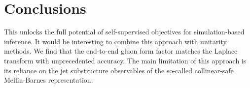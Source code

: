 \section{Conclusions}\label{sec:conclusions}

This unlocks the full potential of self-supervised objectives for
simulation-based inference. It would be interesting to combine this
approach with unitarity methods. We find that the end-to-end gluon form
factor matches the Laplace transform with unprecedented accuracy. The
main limitation of this approach is its reliance on the jet substructure
observables of the so-called collinear-safe Mellin-Barnes
representation.

